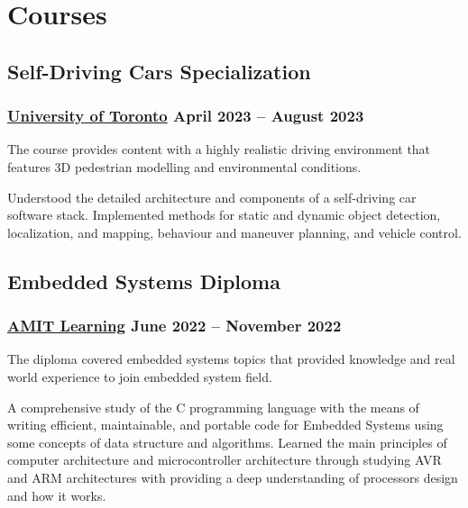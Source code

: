 \section*{Courses}
%
%
%
%
%
%
\subsection*{Self-Driving Cars Specialization}
\subsubsection*{
  \href{https://www.coursera.org/specializations/self-driving-cars}{University of Toronto}
  \hspace*{\fill}
  April 2023 -- August 2023
}
The course provides content with a highly realistic driving environment that features 3D pedestrian modelling and environmental conditions.
\smallskip
\begin{tasks}
  \task Understood the detailed architecture and components of a self-driving car software stack.
  \task Implemented methods for static and dynamic object detection, localization, and mapping, behaviour and maneuver planning, and vehicle control.
\end{tasks}
%
%
%
%
\subsection*{Embedded Systems Diploma}
\subsubsection*{
  \href{https://amit-learning.com/}{AMIT Learning}
  \hspace*{\fill}
  June 2022 -- November 2022
}
The diploma covered embedded systems topics that provided knowledge and real world experience to join embedded system field.
\smallskip
\begin{tasks}
  \task A comprehensive study of the C programming language with the means of writing efficient, maintainable, and portable code for Embedded Systems using some concepts of data structure and algorithms.
  \task Learned the main principles of computer architecture and microcontroller architecture through studying AVR and ARM architectures with providing a deep understanding of processors design and how it works.
\end{tasks}